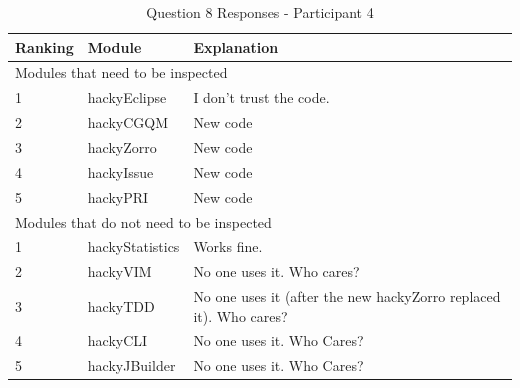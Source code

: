 \begin{table}[!h]
  \begin{center}
    \caption{Question 8 Responses - Participant 4}
    \label{tab:pre-selection-questionnaire-results-8-p4}
    \begin{tabular}{|p{2.0cm}|p{4.0cm}|p{7.0cm}|} \hline
{\bf Ranking} & {\bf Module} & {\bf Explanation} \\ \hline
\multicolumn{3}{|p{13.0cm}|}{Modules that need to be inspected} \\ \hline
1 & hackyEclipse & I don't trust the code. \\ \hline
2 & hackyCGQM & New code \\ \hline
3 & hackyZorro & New code \\ \hline
4 & hackyIssue & New code \\ \hline
5 & hackyPRI & New code \\ \hline
\multicolumn{3}{|p{13.0cm}|}{Modules that do not need to be inspected} \\ \hline
1 & hackyStatistics & Works fine. \\ \hline
2 & hackyVIM & No one uses it. Who cares? \\ \hline
3 & hackyTDD & No one uses it (after the new hackyZorro replaced it). Who
cares? \\ \hline 
4 & hackyCLI & No one uses it. Who Cares? \\ \hline
5 & hackyJBuilder & No one uses it. Who Cares? \\ \hline
    \end{tabular}
  \end{center}
\end{table}


